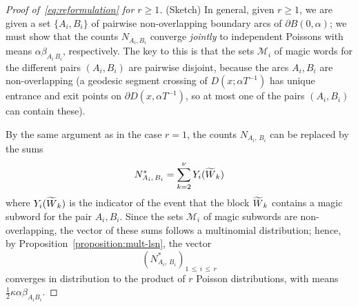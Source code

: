 \documentclass[10pt]{amsart}
\theoremstyle{definition}\newtheorem{defi}[theo]{Definition}\newtheorem{rema}[theo]{Remark}\newtheorem{exam}[theo]{Example}\newtheorem{exem}[theo]{Example}\newtheorem{nota}[theo]{Notation}
\let\oldtilde\tilde
\renewcommand*{\tilde}[1]{\mathchoice{\widetilde{#1}}{\widetilde{#1}}{\oldtilde{#1}}{\oldtilde{#1}}}\let\oldforall\forall
\renewcommand*{\forall}{\mathrel{\oldforall}}
\begin{document}
\begin{proof}[Proof of~\eqref{eq:reformulation} for $r\geq 1$]
(Sketch) In general, given $r \geq 1$, we are given a set $\{A_{i},B_{i}\}$ of pairwise non-overlapping boundary arcs of $\partial B (0,\alpha)$; we must show that the counts $N_{A_{i},B_{i}}$ converge \emph{jointly} to independent Poissons with means $\alpha \beta_{A_{i}\,B_{i}}$, respectively. The key to this is that the sets $\mathcal{M}_{i}$ of magic words for the different pairs $(A_{i},B_{i})$ are pairwise disjoint, because the arcs $A_{i},B_{i}$ are non-overlapping (a geodesic segment crossing of $D (x;\alpha T^{-1})$ has unique entrance and exit points on $\partial D (x,\alpha T^{-1})$, so at most one of the pairs $(A_{i},B_{i})$ can contain these).


By the same argument as in the case $r=1$, the counts $N_{A_{i},\,B_{i}}$ can be replaced by the sums
\[
N^{*}_{A_{i},\,B_{i}}=\sum_{k=2}^{\nu} Y_{i} (\tilde{W}_{k})
\]
where $Y_{i}(\tilde{W}_{k})$ is the indicator of the event that the block $\tilde{W}_{k}$ contains a magic subword for the pair $A_{i},B_{i}$. Since the sets $\mathcal{M}_{i}$ of magic subwords are non-overlapping, the vector of these sums follows a multinomial distribution; hence, by Proposition~\ref{proposition:mult-lsn}, the vector
\[
(N^{*}_{A_{i},\,B_{i}})_{1\,\leq\,i\,\leq\,r}
\]
converges in distribution to the product of $r$ Poisson distributions, with means $\frac{1}{2} \kappa\alpha \beta_{A_{i}B_{i}}$.
\end{proof}
\end{document}

